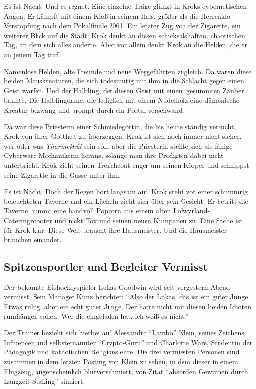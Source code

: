 \documentclass[final]{multiversum}
\begin{document}
Es ist Nacht. Und es regnet. Eine einzelne Träne glänzt in Kroks cybernetischen
Augen. Er kämpft mit einem Kloß in seinem Hals, größer als die
Herrenklo-Verstopfung nach dem Pokalfinale 2061. Ein letzter Zug von der
Zigarette, ein weiterer Blick auf die Stadt. Krok denkt an diesen
schicksalshaften, chaotischen Tag, an dem sich alles änderte. Aber vor allem
denkt Krok an die Helden, die er an jenem Tag traf.

Namenlose Helden, alte Freunde und neue Weggefährten zugleich. Da waren diese
beiden Mauskreaturen, die sich todesmutig mit ihm in die Schlacht gegen einen
Geist warfen. Und der Halbling, der diesen Geist mit einem gesummten Zauber
bannte. Die Halblingdame, die lediglich mit einem Nudelholz eine
dämonische Kreatur bezwang und prompt durch ein Portal verschwand.

Da war diese Priesterin einer Schmiedegöttin, die bis heute ständig versucht,
Krok von ihrer Gottheit zu überzeugen. Krok ist sich noch immer nicht sicher,
wer oder was \emph{Tharmekhûl} sein soll, aber die Priesterin stellte sich als
fähige Cyberware-Mechanikerin heraus, solange man ihre Predigten dabei nicht
unterbricht. Krok zieht seinen Trenchcoat enger um seinen Körper und schnippst
seine Zigarette in die Gasse unter ihm.

Es ist Nacht. Doch der Regen hört langsam auf. Krok steht vor einer schummrig
beleuchteten Taverne und ein Lächeln zieht sich über sein Gesicht. Er betritt
die Taverne, nimmt eine handvoll Popcorn aus einem alten
Lofwyrland-Cateringroboter und nickt Tox und seinen neuen Kumpanen zu. Eine
Sache ist für Krok klar: Diese Welt braucht ihre Hausmeister. Und die
Hausmeister brauchen einander.  

\subsection{Spitzensportler und Begleiter Vermisst}
Der bekannte Eishockeyspieler Lukas Goodwin wird seit vorgestern Abend vermisst.
Sein Manager Kunz berichtet: \enquote{Also der Lukas, das ist ein guter Junge.
Etwas ruhig, aber ein echt guter Junge. Der hätte nicht mit diesen beiden
Idioten rumhängen sollen. Wer die eingeladen hat, ich weiß es nicht.}

Der Trainer bezieht sich hierbei auf Alessandro \enquote{Lambo} Klein, seines
Zeichens Influencer und selbsternannter \enquote{Crypto-Guru} und Charlotte
Wars, Studentin der Pädagogik und katholischen Religionslehre. Die drei
vermissten Personen sind zusammen in dem letzten Posting von Klein zu sehen, in
dem dieser in einem Flugzeug, augenscheinlich blutverschmiert, von \textendash{}
Zitat \textendash{} \enquote{absurden Gewinnen durch Langzeit-Staking} sinniert.
\end{document}
